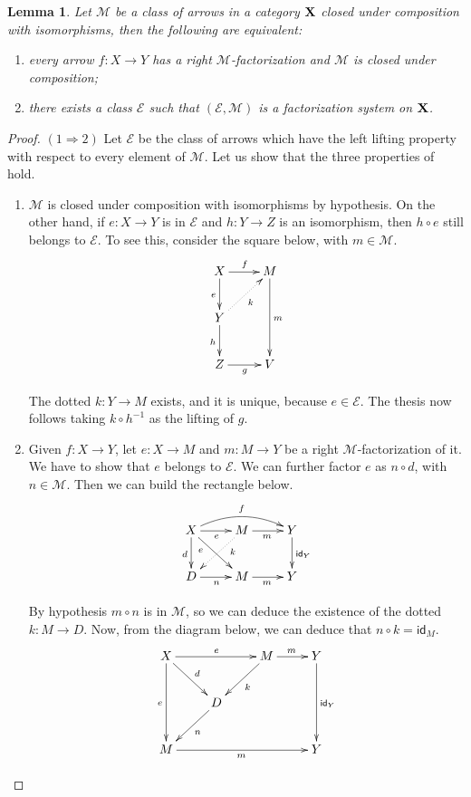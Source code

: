 \documentclass[a4paper]{article}
\newcommand{\id}[1]{\mathsf{id}_{#1}}
\def\X{\textbf {\textup{X}}}
\def\Y{\textbf {\textup{Y}}}
\def\Z{\textbf {\textup{Z}}}
\newtheorem{lemma}[theorem]{Lemma}
\theoremstyle{definition}
\begin{document}
\begin{lemma}\label{lem:fact}Let $\mathcal{M}$ be a class of arrows in a category $\X$ closed under composition with isomorphisms, then the following are equivalent:
	\begin{enumerate}
		\item every arrow $f\colon X\to Y$ has a right $\mathcal{M}$-factorization and $\mathcal{M}$ is closed under composition;
		\item there exists a class $\mathcal{E}$ such that $(\mathcal{E}, \mathcal{M})$ is a factorization system on $\X$.
	\end{enumerate}
\end{lemma}
\begin{proof} $(1\Rightarrow 2)$ Let $\mathcal{E}$ be the class of arrows which have the left lifting property with respect to every element of $\mathcal{M}$. Let us show that the three properties of  hold.
	
	\begin{enumerate}
		\item $\mathcal{M}$ is closed under composition with isomorphisms by hypothesis. On the other hand, if $e\colon X\to Y$ is in $\mathcal{E}$ and $h\colon Y \to Z$ is an isomorphism, then $h\circ e$ still belongs to $\mathcal{E}$. To see this, consider the square below, with $m\in \mathcal{M}$.
		\[\xymatrix{X\ar[r]^{f} \ar[d]_{e}& M\ar[dd]^{m}  \\Y \ar@{.>}[ur]_{k}\ar[d]_h \\Z \ar[r]_{g}& V}\]
		
		The dotted $k\colon Y\to M$ exists, and it is unique, because $e\in \mathcal{E}$. The thesis now follows taking $k\circ h^{-1}$ as the lifting of $g$. 
		
		\item Given $f\colon X\to Y$, let $e\colon X\to M$ and $m\colon M\to Y$ be a right $\mathcal{M}$-factorization of it. We have to show that $e$ belongs to $\mathcal{E}$. We can further factor $e$ as $n\circ d$, with $n\in \mathcal{M}$. Then we can build the rectangle below.
		\[\xymatrix{X  \ar[dr]_(.3){e}\ar[d]_{d} \ar@/^.4cm/[rr]^{f}\ar[r]_{e} & M \ar@{.>}[dl]^(.3){k} \ar[r]_{m} & Y \ar[d]^{\id{Y}}\\
		D \ar[r]_{n} & M \ar[r]_{m}& Y}\]
		
		By hypothesis $m\circ n$ is in $\mathcal{M}$, so we can deduce the existence of the dotted $k\colon M\to D$.   Now, from the diagram below, we can deduce that $n\circ k=\id{M}$.
		\[\xymatrix{X \ar[rr]^{e} \ar[dr]^{d}\ar[dd]_{e}& &M \ar[r]^{m}\ar[dl]^{k}& Y \ar[dd]^{\id{Y}}\\ & D\ar[dl]^{n}\\M\ar[rrr]_{m}&&&Y}\]
		

\end{enumerate}
\end{proof}
\end{document}
